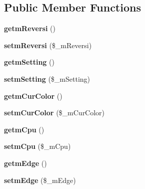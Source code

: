 \subsection*{Public Member Functions}
\begin{DoxyCompactItemize}
\item 
{\bfseries getm\+Reversi} ()\hypertarget{class_reversi_play_a88069db3b0a3146d0dcc7771410fd895}{}\label{class_reversi_play_a88069db3b0a3146d0dcc7771410fd895}

\item 
{\bfseries setm\+Reversi} (\$\+\_\+m\+Reversi)\hypertarget{class_reversi_play_a39c396a4fad5f72261d628f5018f268e}{}\label{class_reversi_play_a39c396a4fad5f72261d628f5018f268e}

\item 
{\bfseries getm\+Setting} ()\hypertarget{class_reversi_play_a1c2a765d1aefb409fd3e39688140ba21}{}\label{class_reversi_play_a1c2a765d1aefb409fd3e39688140ba21}

\item 
{\bfseries setm\+Setting} (\$\+\_\+m\+Setting)\hypertarget{class_reversi_play_a0f01407d5c9237e3bc10e9317dc3d3aa}{}\label{class_reversi_play_a0f01407d5c9237e3bc10e9317dc3d3aa}

\item 
{\bfseries getm\+Cur\+Color} ()\hypertarget{class_reversi_play_a45b05e31f8be40c86e4e23948a05771b}{}\label{class_reversi_play_a45b05e31f8be40c86e4e23948a05771b}

\item 
{\bfseries setm\+Cur\+Color} (\$\+\_\+m\+Cur\+Color)\hypertarget{class_reversi_play_a94119d2910f42dd78f7039f9d848c06c}{}\label{class_reversi_play_a94119d2910f42dd78f7039f9d848c06c}

\item 
{\bfseries getm\+Cpu} ()\hypertarget{class_reversi_play_ac0571dfe3aa8b4f2d83ffda38eff9570}{}\label{class_reversi_play_ac0571dfe3aa8b4f2d83ffda38eff9570}

\item 
{\bfseries setm\+Cpu} (\$\+\_\+m\+Cpu)\hypertarget{class_reversi_play_a5cc7789f378a0767a17d8eddf5910005}{}\label{class_reversi_play_a5cc7789f378a0767a17d8eddf5910005}

\item 
{\bfseries getm\+Edge} ()\hypertarget{class_reversi_play_ada26f3681011904528f3e3dfed9f17df}{}\label{class_reversi_play_ada26f3681011904528f3e3dfed9f17df}

\item 
{\bfseries setm\+Edge} (\$\+\_\+m\+Edge)\hypertarget{class_reversi_play_a6888b14f2d98174e4a2e5886a902a8b0}{}\label{class_reversi_play_a6888b14f2d98174e4a2e5886a902a8b0}


\end{DoxyCompactItemize}
